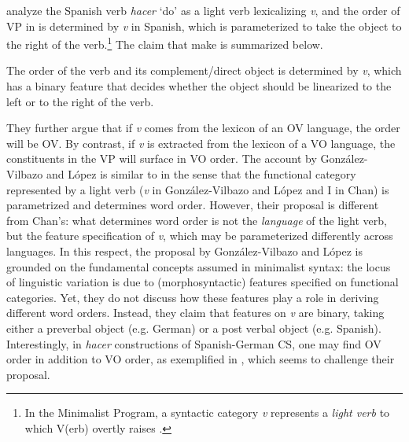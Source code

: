 \citeauthor{GonzalezLopez2011} analyze the Spanish verb \textit{hacer} ‘do’ as a light verb lexicalizing \textit{v}, and the order of \ac{VP} in  is determined by \textit{v} in Spanish, which is parameterized to take the object to the right of the verb.\footnote{In the Minimalist Program, a syntactic category \textit{v} represents a \textit{light verb} to which V(erb) overtly raises \citep[315]{Chomsky1995}.} The claim that \citeauthor{GonzalezLopez2011} make is summarized below. 

\begin{exe}
\ex \label{ex:13} The order of the verb and its complement/direct object is determined by \textit{v}, which has a binary feature that decides whether the object should be linearized to the left or to the right of the verb. 
\end{exe}

They further argue that if \textit{v} comes from the lexicon of an \ac{OV} language, the order will be \ac{OV}. By contrast, if \textit{v} is extracted from the lexicon of a \ac{VO} language, the constituents in the \ac{VP} will surface in \ac{VO} order. The account by González-Vilbazo and López is similar to  in the sense that the functional category represented by a light verb (\textit{v} in González-Vilbazo and López and I in Chan) is parametrized and determines word order. However, their proposal is different from Chan’s: what determines word order is not the \textit{language} of the light verb, but the feature specification of \textit{v}, which may be parameterized differently across languages. In this respect, the proposal by González-Vilbazo and López is grounded on the fundamental concepts assumed in minimalist syntax: the locus of linguistic variation is due to (morphosyntactic) features specified on functional categories. Yet, they do not discuss how these features play a role in deriving different word orders. Instead, they claim that features on \textit{v} are binary, taking either a preverbal object (e.g. German) or a post verbal object (e.g. Spanish). Interestingly, in \textit{hacer} constructions of Spanish-German \ac{CS}, one may find \ac{OV} order in addition to \ac{VO} order, as exemplified in , which seems to challenge their proposal.

